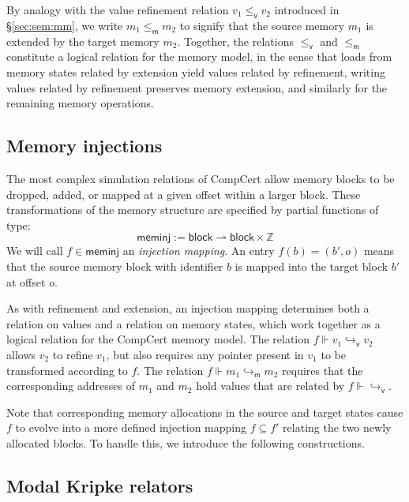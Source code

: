 \documentclass[draft,11pt]{report}
\newcommand{\kw}[1]{\ensuremath{ \mathsf{#1} }}
\newcommand{\vref}{\le_\kw{v}}   %
\newcommand{\mext}{\le_\kw{m}}   %
\begin{document}
By analogy with
the value refinement relation $v_1 \vref v_2$
introduced in \S\ref{sec:sem:mm},
we write $m_1 \mext m_2$ to signify that
the source memory $m_1$ is extended by
the target memory $m_2$.
Together,
the relations $\vref$ and $\mext$
constitute a logical relation for the memory model,
in the sense that
loads from memory states related by extension
yield values related by refinement,
writing values related by refinement
preserves memory extension,
and similarly for the remaining memory operations.


\subsection{Memory injections} \label{sec:meminj} %

The most complex simulation relations of CompCert
allow memory blocks to be dropped, added, or
mapped at a given offset within a larger block.
These transformations of the memory structure
are specified by partial functions of type:
\[
  \kw{meminj} := \kw{block} \rightharpoonup \kw{block} \times \mathbb{Z}
\]
We will call $f \in \kw{meminj}$
an \emph{injection mapping}.
An entry $f(b) = (b', o)$
means that the source memory block with identifier $b$
is mapped into the target block $b'$
at offset $o$.

As with refinement and extension,
an injection mapping determines both
a relation on values and
a relation on memory states,
which work together
as a logical relation for the CompCert memory model.
The relation $f \Vdash v_1 \hookrightarrow_\kw{v} v_2$
allows $v_2$ to refine $v_1$,
but also requires any pointer present in $v_1$ 
to be transformed according to $f$.
The relation $f \Vdash m_1 \hookrightarrow_\kw{m} m_2$
requires that the corresponding addresses of $m_1$ and $m_2$
hold values that are related by $f \Vdash {\hookrightarrow_\kw{v}}$.

Note that corresponding memory allocations
in the source and target states cause $f$ to
evolve into a more defined injection mapping $f \subseteq f'$
relating the two newly allocated blocks.
To handle this,
we introduce the following constructions.


\subsection{Modal Kripke relators} %
\end{document}
